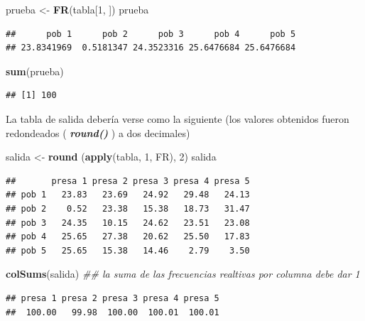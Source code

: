 \documentclass[]{book}
\newenvironment{Shaded}{\begin{snugshade}}{\end{snugshade}}
\newcommand{\CommentTok}[1]{\textcolor[rgb]{0.56,0.35,0.01}{\textit{#1}}}
\newcommand{\DecValTok}[1]{\textcolor[rgb]{0.00,0.00,0.81}{#1}}
\newcommand{\KeywordTok}[1]{\textcolor[rgb]{0.13,0.29,0.53}{\textbf{#1}}}
\newcommand{\NormalTok}[1]{#1}
\newcommand{\StringTok}[1]{\textcolor[rgb]{0.31,0.60,0.02}{#1}}
\begin{document}
\begin{Shaded}
\begin{Highlighting}[]
\NormalTok{prueba <-}\StringTok{ }\KeywordTok{FR}\NormalTok{(tabla[}\DecValTok{1}\NormalTok{, ])}
\NormalTok{prueba}
\end{Highlighting}
\end{Shaded}

\begin{verbatim}
##      pob 1      pob 2      pob 3      pob 4      pob 5 
## 23.8341969  0.5181347 24.3523316 25.6476684 25.6476684
\end{verbatim}

\begin{Shaded}
\begin{Highlighting}[]
\KeywordTok{sum}\NormalTok{(prueba)}
\end{Highlighting}
\end{Shaded}

\begin{verbatim}
## [1] 100
\end{verbatim}

La tabla de salida debería verse como la siguiente (los valores obtenidos fueron redondeados ( \textbf{\emph{round()}} ) a dos decimales)

\begin{Shaded}
\begin{Highlighting}[]
\NormalTok{salida <-}\StringTok{ }\KeywordTok{round}\NormalTok{ (}\KeywordTok{apply}\NormalTok{(tabla, }\DecValTok{1}\NormalTok{, FR), }\DecValTok{2}\NormalTok{)}
\NormalTok{salida}
\end{Highlighting}
\end{Shaded}

\begin{verbatim}
##       presa 1 presa 2 presa 3 presa 4 presa 5
## pob 1   23.83   23.69   24.92   29.48   24.13
## pob 2    0.52   23.38   15.38   18.73   31.47
## pob 3   24.35   10.15   24.62   23.51   23.08
## pob 4   25.65   27.38   20.62   25.50   17.83
## pob 5   25.65   15.38   14.46    2.79    3.50
\end{verbatim}

\begin{Shaded}
\begin{Highlighting}[]
\KeywordTok{colSums}\NormalTok{(salida) }\CommentTok{## la suma de las frecuencias realtivas por columna debe dar 1}
\end{Highlighting}
\end{Shaded}

\begin{verbatim}
## presa 1 presa 2 presa 3 presa 4 presa 5 
##  100.00   99.98  100.00  100.01  100.01
\end{verbatim}
\end{document}
